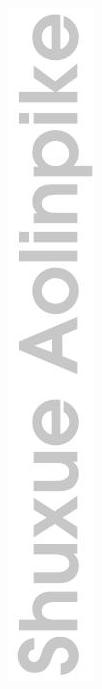 \documentclass[10pt]{article}
\begin{document}
\includegraphics[max width=\textwidth, center]{2024_10_30_66b8e5e701da2093c133g-002(3)}\\
\end{document}
